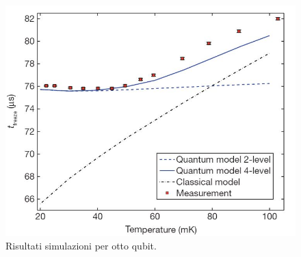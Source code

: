 \begin{figure}[htbp]
\centering
\includegraphics[scale=0.6]{Immagini/qa-chain.jpg}
\caption{Risultati simulazioni per otto qubit.}
\label{figura:qa-chain}
\end{figure}
